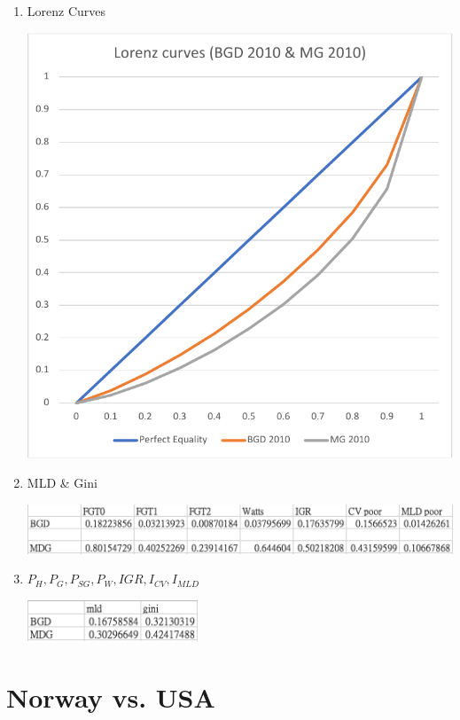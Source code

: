 \documentclass{article}[13pt]
\begin{document}
\begin{enumerate}
    \item{Lorenz Curves}
    
    \includegraphics[width=5in]{lorenzcurve_bgd&mg.pdf}

    \item{MLD \& Gini}
    
    \includegraphics[width=5in]{bdg_mdg_1.png}

    \item{$P_H, P_G, P_{SG}, P_W, IGR, I_{CV}, I_{MLD}$}
    
    \includegraphics[width=2in]{bdg_mdg_2.png}
    
\end{enumerate}

\newpage


\section{Norway vs. USA}
\end{document}
